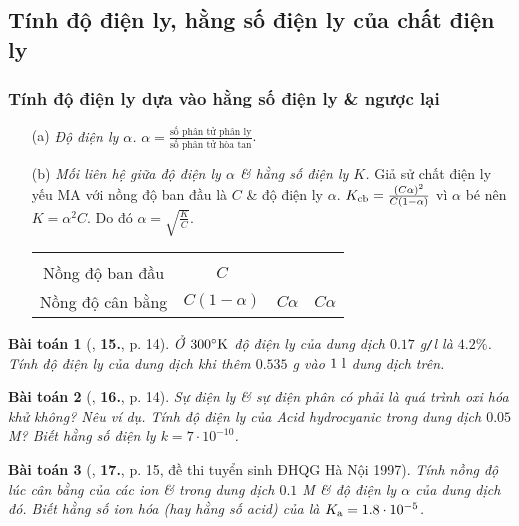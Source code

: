 \documentclass{article}
\numberwithin{equation}{section}
\newtheorem{baitoan}{Bài toán}[section]
\begin{document}
\subsection{Tính độ điện ly, hằng số điện ly của chất điện ly}

\subsubsection{Tính độ điện ly dựa vào hằng số điện ly \& ngược lại}
\begin{itemize}
	\item[(a)] \textit{Độ điện ly $\alpha$.} $\alpha = \frac{\mbox{số phân tử phân ly}}{\mbox{số phân tử hòa tan}}$.
	\item[(b)] \textit{Mối liên hệ giữa độ điện ly $\alpha$ \& hằng số điện ly $K$.} Giả sử chất điện ly yếu MA với nồng độ ban đầu là $C$ \& độ điện ly $\alpha$. $K_{\rm cb} = \frac{(C\alpha)^2}{C(1 - \alpha)}$  vì $\alpha$ bé nên $K = \alpha^2C$. Do đó $\alpha = \sqrt{\frac{K}{C}}$.
	
	\begin{table}[H]
		\centering
		\begin{tabular}{cccc}
			& \multicolumn{3}{c}{\ce{MA <=> M+ + A-}}\\
			Nồng độ ban đầu & $C$ &  &  \\
			Nồng độ cân bằng & $C(1 - \alpha)$ & $C\alpha$ & $C\alpha$ \\
		\end{tabular}
	\end{table}	
\end{itemize}

\begin{baitoan}[\cite{An2004}, \textbf{15.}, p. 14]
	Ở $300^\circ{\rm K}$ độ điện ly của dung dịch \emph{} $0.17$ \emph{g\texttt{/}l} là $4.2\%$. Tính độ điện ly của dung dịch khi thêm $0.535$ \emph{g} \emph{} vào $\rm 1\ l$ dung dịch trên.
\end{baitoan}

\begin{baitoan}[\cite{An2004}, \textbf{16.}, p. 14]
	Sự điện ly \& sự điện phân có phải là quá trình oxi hóa khử không? Nêu ví dụ. Tính độ điện ly của Acid hydrocyanic \emph{} trong dung dịch $0.05$ \emph{M}? Biết hằng số điện ly $k = 7\cdot 10^{-10}$.
\end{baitoan}

\begin{baitoan}[\cite{An2004}, \textbf{17.}, p. 15, đề thi tuyển sinh ĐHQG Hà Nội 1997]
	Tính nồng độ lúc cân bằng của các ion \emph{} \& \emph{} trong dung dịch \emph{} $0.1$ \emph{M} \& độ điện ly $\alpha$ của dung dịch đó. Biết hằng số ion hóa (hay hằng số acid) của \emph{} là $K_{\rm a} = 1.8\cdot 10^{-5}$.
\end{baitoan}
\end{document}
